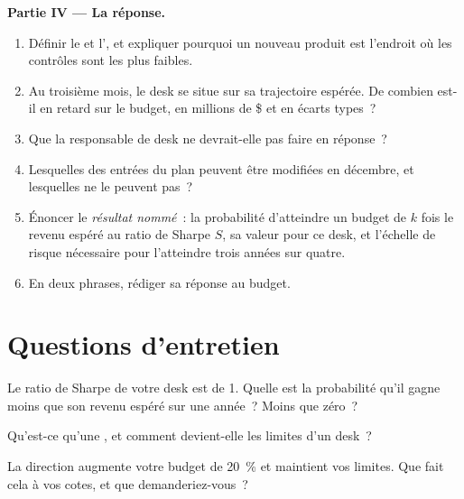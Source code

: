 \begin{problem}
\medskip\noindent\textbf{Partie IV --- La réponse.}
\begin{enumerate}[resume]
\item Définir le  et l', et expliquer pourquoi un nouveau produit est l'endroit où les contrôles sont les plus faibles.
\item Au troisième mois, le desk se situe sur sa trajectoire espérée. De combien est-il en retard sur le budget, en millions de \$ et en écarts types~?
\item Que la responsable de desk ne devrait-elle pas faire en réponse~?
\item Lesquelles des entrées du plan peuvent être modifiées en décembre, et lesquelles ne le peuvent pas~?
\item Énoncer le \emph{résultat nommé}~: la probabilité d'atteindre un budget de $k$ fois le revenu espéré au ratio de Sharpe $S$, sa valeur pour ce
desk, et l'échelle de risque nécessaire pour l'atteindre trois années sur quatre.
\item En deux phrases, rédiger sa réponse au budget.
\end{enumerate}
\end{problem}

\section{Questions d'entretien}

\begin{interviewq}\label{iq:fm:the-head-of-desks-job:1}
Le ratio de Sharpe de votre desk est de 1. Quelle est la probabilité qu'il gagne moins que son revenu espéré sur une année~? Moins que zéro~?
\end{interviewq}

\begin{interviewq}\label{iq:fm:the-head-of-desks-job:2}
Qu'est-ce qu'une , et comment devient-elle les limites d'un desk~?
\end{interviewq}

\begin{interviewq}\label{iq:fm:the-head-of-desks-job:3}
La direction augmente votre budget de 20~\% et maintient vos limites. Que fait cela à vos cotes, et que demanderiez-vous~?
\end{interviewq}

